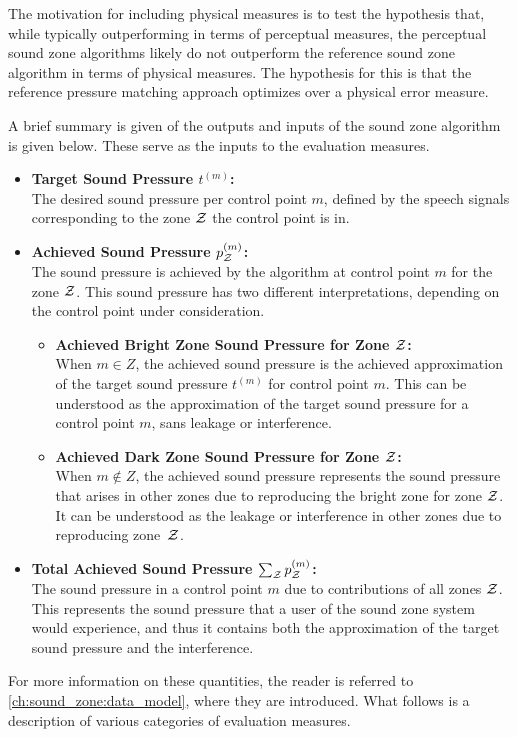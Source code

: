 The motivation for including physical measures is to test the hypothesis that, 
while typically outperforming in terms of perceptual measures, the perceptual sound zone algorithms likely do not 
outperform the reference sound zone algorithm in terms of physical measures.
The hypothesis for this is that the reference pressure matching approach optimizes over a physical error measure.

A brief summary is given of the outputs and inputs of the sound zone algorithm is given below.
These serve as the inputs to the evaluation measures.
\begin{itemize}
    \item \textbf{Target Sound Pressure $t^{(m)}$:}\\
        The desired sound pressure per control point $m$, defined by the speech signals corresponding to the zone $\mathcal{Z}$ the control point is in.
    \item \textbf{Achieved Sound Pressure $p_{\mathcal{Z}}^{(m)}$:}\\
        The sound pressure is achieved by the algorithm at control point $m$ for the zone $\mathcal{Z}$.
        This sound pressure has two different interpretations, depending on the control point under consideration.
        \begin{itemize}
            \item \textbf{Achieved Bright Zone Sound Pressure for Zone $\mathcal{Z}$:}\\
                When $m \in Z$, the achieved sound pressure is the achieved approximation of the target sound pressure $t^{(m)}$ for control point $m$.
                This can be understood as the approximation of the target sound pressure for a control point $m$, sans leakage or interference. 
            \item \textbf{Achieved Dark Zone Sound Pressure for Zone $\mathcal{Z}$:}\\
                When $m \notin Z$, the achieved sound pressure represents the sound pressure that arises in other zones due to reproducing the bright zone for zone $\mathcal{Z}$. 
                It can be understood as the leakage or interference in other zones due to reproducing zone~$\mathcal{Z}$.
        \end{itemize}
    \item \textbf{Total Achieved Sound Pressure $\sum_{\mathcal{Z}} p_{\mathcal{Z}}^{(m)}$:}\\
        The sound pressure in a control point $m$ due to contributions of all zones $\mathcal{Z}$.
        This represents the sound pressure that a user of the sound zone system would experience,
        and thus it contains both the approximation of the target sound pressure and the interference.
\end{itemize}
For more information on these quantities, the reader is referred to \autoref{ch:sound_zone:data_model}, where they are introduced.
What follows is a description of various categories of evaluation measures.

